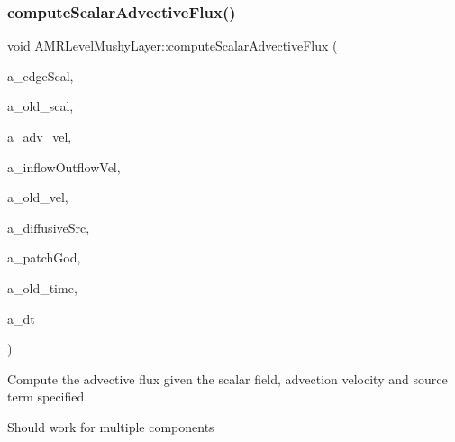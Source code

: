 \subsubsection{\texorpdfstring{compute\+Scalar\+Advective\+Flux()}{computeScalarAdvectiveFlux()}\hspace{0.1cm}{\footnotesize\ttfamily [1/2]}}
{\footnotesize\ttfamily void A\+M\+R\+Level\+Mushy\+Layer\+::compute\+Scalar\+Advective\+Flux (\begin{DoxyParamCaption}\item[{\textbf{ Level\+Data}$<$ \textbf{ Flux\+Box} $>$ \&}]{a\+\_\+edge\+Scal,  }\item[{\textbf{ Level\+Data}$<$ \textbf{ F\+Array\+Box} $>$ \&}]{a\+\_\+old\+\_\+scal,  }\item[{\textbf{ Level\+Data}$<$ \textbf{ Flux\+Box} $>$ \&}]{a\+\_\+adv\+\_\+vel,  }\item[{\textbf{ Level\+Data}$<$ \textbf{ Flux\+Box} $>$ \&}]{a\+\_\+inflow\+Outflow\+Vel,  }\item[{\textbf{ Level\+Data}$<$ \textbf{ F\+Array\+Box} $>$ \&}]{a\+\_\+old\+\_\+vel,  }\item[{\textbf{ Level\+Data}$<$ \textbf{ F\+Array\+Box} $>$ \&}]{a\+\_\+diffusive\+Src,  }\item[{\textbf{ Patch\+Godunov} \&}]{a\+\_\+patch\+God,  }\item[{\textbf{ Real}}]{a\+\_\+old\+\_\+time,  }\item[{\textbf{ Real}}]{a\+\_\+dt }\end{DoxyParamCaption})\hspace{0.3cm}{\ttfamily [protected]}}



Compute the advective flux given the scalar field, advection velocity and source term specified. 

Should work for multiple components \mbox{\label{class_a_m_r_level_mushy_layer_af3fc0d2c619ba6ad099b1ad6c39b352e}} 
